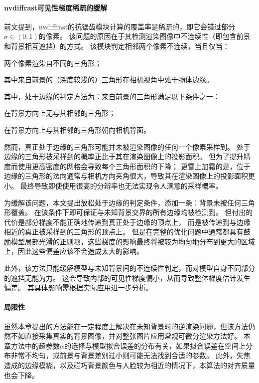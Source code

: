\paragraph{nvdiffrast可见性梯度稀疏的缓解}
前文提到，nvdiffrast的抗锯齿模块计算的覆盖率是稀疏的，即它会错过部分$\sigma\in(0,1)$的像素。
该问题的原因在于其检测渲染图像中不连续性（即包含前景和背景相互遮挡）的方式。
该模块判定相邻两个像素不连续，当且仅当：
\begin{enumerate*}
\item 两个像素渲染自不同的三角形；
\item 其中来自前景的（深度较浅的）三角形在相机视角中处于物体边缘。
\end{enumerate*}
其中，处于边缘的判定方法为：来自前景的三角形满足以下条件之一：
\begin{enumerate*}
\item 在背景方向上无与其相邻的三角形；
\item 在背景方向上与其相邻的三角形朝向相机背面。
\end{enumerate*}
然而，真正处于边缘的三角形可能并未被渲染图像的任何一个像素采样到。
处于边缘的三角形被采样到的概率正比于其在渲染图像上的投影面积。
但为了提升精度而使用更高密度的网格会导致每个三角形面积的下降；
更雪上加霜的是，位于边缘的三角形的法向通常与相机方向夹角很大，导致其在渲染图像上的投影面积更小。
最终导致即使使用很高的分辨率也无法实现令人满意的采样概率。

为缓解该问题，本文提出放松处于边缘的判定条件，添加一条：背景未被任何三角形覆盖。
在该条件下即可保证与未知背景交界的所有边缘均被检测到。
但付出的代价是部分梯度不能正确地传递到真正处于边缘的顶点上，
而是被传递到与边缘相近的真正被采样到的三角形的顶点上。
但是在完整的优化问题中通常都具有鼓励模型局部光滑的正则项，这些梯度的影响最终将被较为均匀地分布到更大的区域上，因此这些偏差应该不会造成太大的影响。

此外，该方法只能缓解模型与未知背景间的不连续性判定，而对模型自身不同部分的遮挡无能为力。
这会导致内部的可见性梯度偏小，从而导致整体梯度估计发生偏差。
其具体影响需根据实际应用进一步分析。


\paragraph{局限性}

虽然本章提出的方法能在一定程度上解决在未知背景时的逆渲染问题，但该方法仍然不如直接采集真实的背景图像，并对整张图片应用常规可微分渲染方法好。
本章方法中的超参数$\alpha$的选择与模型拟合误差的分布有关，如果拟合误差在空间上分布非常不均匀，或前景与背景差别过小则可能无法找到合适的参数。
此外，失焦造成的边缘模糊，以及碰巧背景颜色与人脸较为相近的情况下，本算法的对齐质量也会下降。

